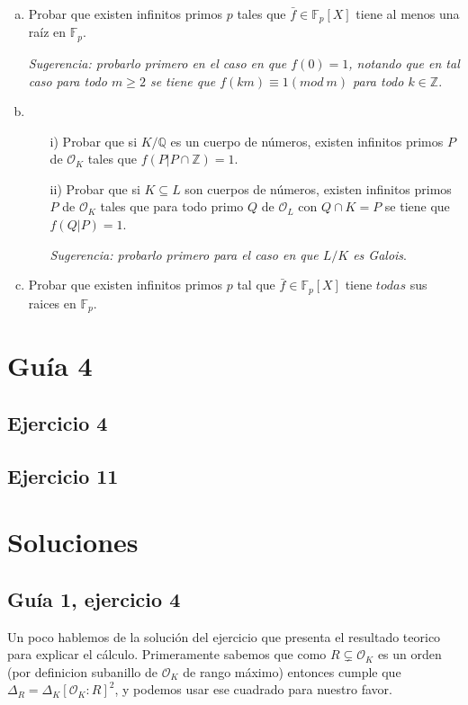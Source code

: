 \documentclass[12pt]{amsart}
\newcommand{\QQ}{\mathbb{Q}}
\newcommand{\ZZ}{\mathbb{Z}}
\newcommand{\FF}{\mathbb{F}}
\newcommand{\OO}{\mathcal{O}}
\theoremstyle{plain}
\begin{document}
\begin{enumerate}[a)]
    \item Probar que existen infinitos primos $p$ tales que $\bar{f}\in
    \FF_p[X]$ tiene al menos una raíz en $\FF_p$.

    \textit{Sugerencia: probarlo primero en el caso en que $f(0) = 1$, 
    notando que en tal caso para todo $m \geq 2$ se tiene que 
    $f(km)\equiv 1 (mod\ m)$ para todo $k\in \ZZ$}.
    
    \item \begin{enumerate}
        \item[\textup{i)}] Probar que si $K/\QQ$ es un cuerpo de números, existen 
        infinitos primos $P$ de $\OO_K$ tales que $f(P|P\cap\ZZ)=1$.

        \item[\textup{ii)}] Probar que si $K\subseteq L$ son cuerpos de números, 
        existen infinitos primos $P$ de $\OO_K$ tales que para todo 
        primo $Q$ de $\OO_L$ con $Q\cap K = P$ se tiene que $f(Q|P)=1$.

        \textit{Sugerencia: probarlo primero para el caso en que $L/K$
        es Galois}.
    \end{enumerate}
    
    \item Probar que existen infinitos primos $p$ tal que $\bar{f}\in
    \FF_p[X]$ tiene $todas$ sus raices en $\FF_p$.
\end{enumerate}

\section*{Guía 4}

\subsection*{Ejercicio 4} 

\subsection*{Ejercicio 11} 

\newpage

\section*{Soluciones}

\subsection*{Guía 1, ejercicio 4}
Un poco hablemos de la solución del ejercicio que presenta el resultado
teorico para explicar el cálculo. Primeramente sabemos que como 
$R \subsetneq \OO_K$ es un orden (por definicion subanillo de $\OO_K$
de rango máximo) entonces cumple que $\Delta_R = \Delta_K [\OO_K:R]^2$, y podemos usar ese cuadrado para nuestro favor. 
\end{document}
